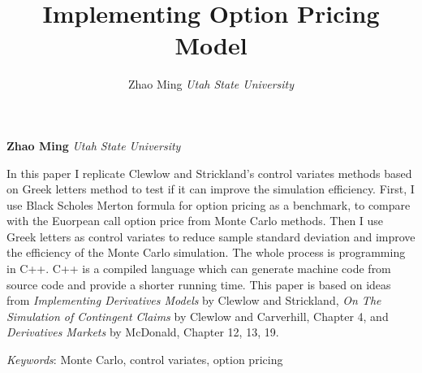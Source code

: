 \documentclass[11pt,]{article}
\title{Implementing Option Pricing Model  }
\author{\Large Zhao Ming\vspace{0.05in} \newline\normalsize\emph{Utah State University}  }
\date{}
\newcommand*{\authorfont}{\fontfamily{phv}\selectfont}
\renewenvironment{abstract}
 {{%
    \setlength{\leftmargin}{0mm}
    \setlength{\rightmargin}{\leftmargin}%
  }%
  \relax}
 {\endlist}
\begin{document}
	
%

{%
\setlength{\parindent}{0pt}
\thispagestyle{plain}
{\fontsize{18}{20}\selectfont\raggedright 
\maketitle  %

}

{
   \vskip 13.5pt\relax \normalsize\fontsize{11}{12} 
\textbf{\authorfont Zhao Ming} \hskip 15pt \emph{\small Utah State University}   

}

}







\begin{abstract}

    \hbox{\vrule height .2pt width 39.14pc}

    \vskip 8.5pt %

\noindent In this paper I replicate Clewlow and Strickland's control variates
methods based on Greek letters method to test if it can improve the
simulation efficiency. First, I use Black Scholes Merton formula for
option pricing as a benchmark, to compare with the Euorpean call option
price from Monte Carlo methods. Then I use Greek letters as control
variates to reduce sample standard deviation and improve the efficiency
of the Monte Carlo simulation. The whole process is programming in C++.
C++ is a compiled language which can generate machine code from source
code and provide a shorter running time. This paper is based on ideas
from \emph{Implementing Derivatives Models} by Clewlow and Strickland,
\emph{On The Simulation of Contingent Claims} by Clewlow and Carverhill,
Chapter 4, and \emph{Derivatives Markets} by McDonald, Chapter 12, 13,
19.


\vskip 8.5pt \noindent \emph{Keywords}: Monte Carlo, control variates, option pricing \par

    \hbox{\vrule height .2pt width 39.14pc}



\end{abstract}
\end{document}
